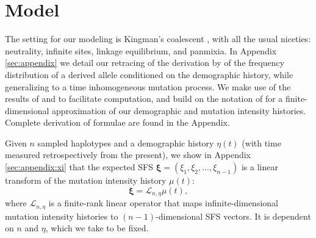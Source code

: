 \documentclass[11pt]{article}
\begin{document}

\section*{Model}\label{sec:model}

The setting for our modeling is Kingman's coalescent \citep{Kingman1982-ge, Kingman1982-tf, Kingman1982-ys, Kingman2000-jr}, with all the usual niceties: neutrality, infinite sites, linkage equilibrium, and panmixia.
In Appendix \ref{sec:appendix} we detail our retracing of the derivation by \cite{Griffiths1998-qf} of the frequency distribution of a derived allele conditioned on the demographic history, while generalizing to a time inhomogeneous mutation process.
We make use of the results of \cite{Polanski2003-kg} and \cite{Polanski2003-ll} to facilitate computation, and build on the notation of \cite{Rosen2018-bb} for a finite-dimensional approximation of our demographic and mutation intensity histories.
Complete derivation of formulae are found in the Appendix.

Given $n$ sampled haplotypes and a demographic history $\eta(t)$ (with time measured retrospectively from the present), we show in Appendix \ref{sec:appendix:xi} that the expected SFS $\boldsymbol \xi = (\xi_1, \xi_2,\dots, \xi_{n-1})$ is a linear transform of the mutation intensity history $\mu(t)$:
\begin{equation}
  \label{eqn:transform}
\boldsymbol \xi = \mathcal{L}_{n,\eta}\mu(t),
\end{equation}
where $\mathcal{L}_{n,\eta}$ is a finite-rank linear operator that maps infinite-dimensional mutation intensity histories to $(n-1)$-dimensional SFS vectors.
It is dependent on $n$ and $\eta$, which we take to be fixed.

\end{document}
